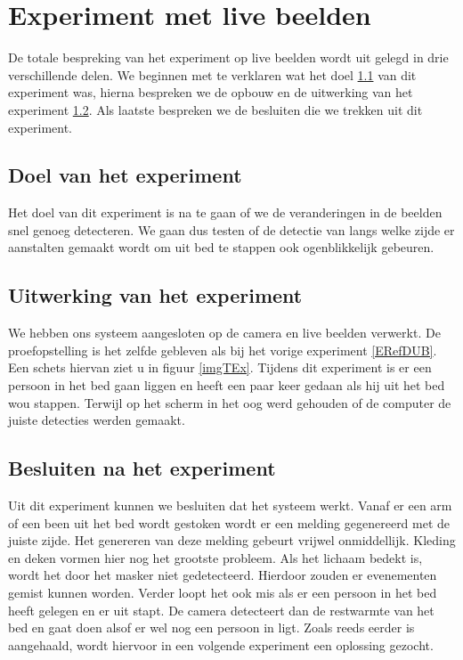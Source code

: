 \section{Experiment met live beelden}
\label{ERefELB}
De totale bespreking van het experiment op live beelden wordt uit gelegd in drie verschillende delen. We beginnen met te verklaren wat het doel \ref{ERefLBD} van dit experiment was, hierna bespreken we de opbouw en de uitwerking van het experiment \ref{ERefLBV}. Als laatste bespreken we de besluiten die we trekken uit dit experiment.

\subsection{Doel van het experiment}
\label{ERefLBD}
Het doel van dit experiment is na te gaan of we de veranderingen in de beelden snel genoeg detecteren. We gaan dus testen of de detectie van langs welke zijde er aanstalten gemaakt wordt om uit bed te stappen ook ogenblikkelijk gebeuren. 

\subsection{Uitwerking van het experiment}
\label{ERefLBV}
We  hebben ons systeem aangesloten op de camera en live beelden verwerkt. De proefopstelling is het zelfde gebleven als bij het vorige experiment \ref{ERefDUB}. Een schets hiervan ziet u in figuur \ref{imgTEx}. Tijdens dit experiment is er een persoon in het bed gaan liggen en heeft een paar keer gedaan als hij uit het bed wou stappen. Terwijl op het scherm in het oog werd gehouden of de computer de juiste detecties werden gemaakt.

\subsection{Besluiten na het experiment}
Uit dit experiment kunnen we besluiten dat het systeem werkt. Vanaf er een arm of een been uit het bed wordt gestoken wordt er een melding gegenereerd met de juiste zijde. Het genereren van deze melding gebeurt vrijwel onmiddellijk. Kleding en deken vormen hier nog het grootste probleem. Als het lichaam bedekt is, wordt het door het masker niet gedetecteerd. Hierdoor zouden er evenementen gemist kunnen worden. Verder loopt het ook mis als er een persoon in het bed heeft gelegen en er uit stapt. De camera detecteert dan de restwarmte van het bed en gaat doen alsof er wel nog een persoon in ligt. Zoals reeds eerder is aangehaald, wordt hiervoor in een volgende experiment een oplossing gezocht.
 
